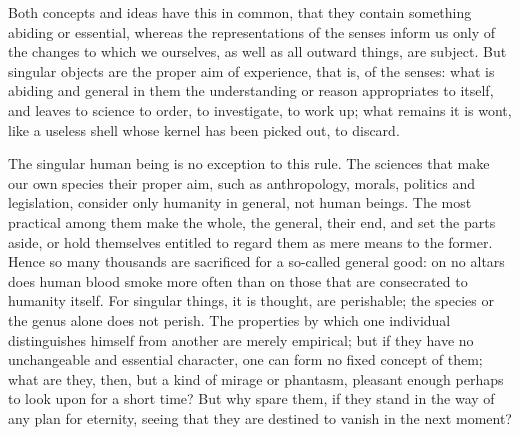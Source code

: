 \documentclass[12pt,a4paper,openany]{book}
\newcommand{\opage}[1]{\marginnote{\footnotesize\textit{[#1]}}}
\begin{document}
Both concepts and ideas have this in common, that they contain something abiding
or essential, whereas the representations of the senses inform us only of the
changes to which we ourselves, as well as all outward things, are subject. But
singular objects are the proper aim of experience, that is, of the senses: what is
abiding and general in them the understanding or reason appropriates to itself, and
leaves to science to order, to investigate, to work up; what remains it is wont,
like a useless shell whose kernel has been picked out, to discard.

The singular human being is no exception to this rule. The sciences that make our
own species their proper aim, such as anthropology, morals, politics and
legislation, consider only humanity in general, not human beings. The most
practical among them make the whole, the general, their end, and set the parts
aside, or hold themselves entitled to regard them as mere means to the former.
Hence so many thousands are sacrificed for a so-called general good: on
\setcounter{footnote}{0}%
\opage{101}no altars does human blood smoke more often than on those that are consecrated to
humanity itself. For singular things, it is thought, are perishable; the species
or the genus alone does not perish. The properties by which one individual
distinguishes himself from another are merely empirical; but if they have no
unchangeable and essential character, one can form no fixed concept of them; what
are they, then, but a kind of mirage or phantasm, pleasant enough perhaps to look
upon for a short time? But why spare them, if they stand in the way of any plan
for eternity, seeing that they are destined to vanish in the next moment?
\end{document}
